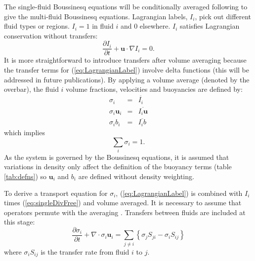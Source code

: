 \documentclass[draft]{agujournal2019}
\begin{document}
The single-fluid Boussinesq equations will be conditionally averaged following  to give the multi-fluid Boussinesq equations. Lagrangian labels, $I_i$, pick out different fluid types or regions. $I_i=1$ in fluid $i$ and 0 elsewhere. $I_i$ satisfies Lagrangian conservation without transfers:
\begin{equation}
\frac{\partial I_i}{\partial t} + \mathbf{u}\cdot\nabla I_i = 0.
\label{eq:LagrangianLabel}
\end{equation}
It is more straightforward to introduce transfers after volume averaging because the transfer terms for (\ref{eq:LagrangianLabel}) involve delta functions (this will be addressed in future publications). 
By applying a volume average (denoted by the overbar), the fluid $i$ volume fractions, velocities and buoyancies are defined by:
\begin{eqnarray}
\sigma_i &=& \overline{I_i} \\
\sigma_i \mathbf{u}_i &=& \overline{I_i \mathbf{u}} \\
\sigma_i b_i &=& \overline{I_i b}
\label{eq:defineFluidFields}
\end{eqnarray}
which implies
\begin{equation}
\sum_{i}\sigma_{i}  =  1.
\label{eq:sumOne}
\end{equation}
As the system is governed by the Boussinesq equations, it is assumed that variations in density only affect the definition of the buoyancy terms (table \protect\ref{tab:defns}) so $\mathbf{u}_i$ and $b_i$ are defined without density weighting. 

To derive a transport equation for $\sigma_i$, (\ref{eq:LagrangianLabel}) is combined with $I_i$ times (\ref{eq:singleDivFree}) and volume averaged. 
It is necessary to assume that
operators permute with the averaging \cite<as described by>{TWV+18}. Transfers between fluids are included at this stage:
\begin{equation}
\frac{\partial\sigma_{i}}{\partial t}+\nabla\cdot\sigma_{i}\mathbf{u}_{i}  =  \sum_{j\ne i}\left\{ \sigma_{j}S_{ji}-\sigma_{i}S_{ij}\right\}
\label{eq:sigma}
\end{equation}
where $\sigma_{i}S_{ij}$ is the transfer rate from fluid $i$ to $j$.
\end{document}
